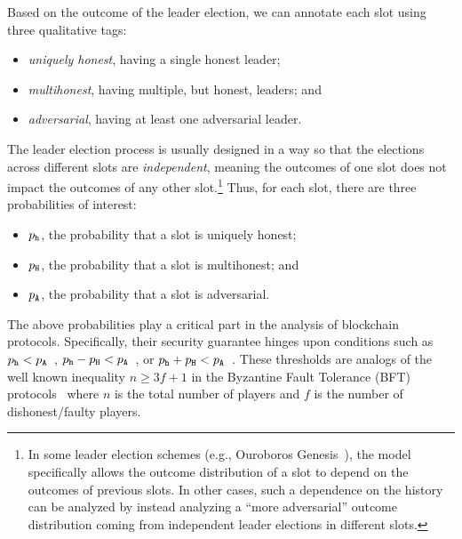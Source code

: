 \label{sec:leader-election-probs}
Based on the outcome of the leader election, 
we can annotate each slot using three qualitative tags: 
\begin{itemize}
\item \emph{uniquely honest}, having a single honest leader;
\item \emph{multihonest}, having multiple, but honest,
  leaders; and
\item \emph{adversarial}, having at least one adversarial leader.
\end{itemize}
The leader election process is usually designed in a way so that 
the elections across different slots are \emph{independent}, 
meaning the outcomes of one slot does not impact the outcomes of any other slot.\footnote{
  In some leader election schemes (e.g., Ouroboros Genesis~\cite{Genesis}), 
  the model specifically allows 
  the outcome distribution of a slot to depend on the outcomes of previous slots. 
  In other cases, 
  such a dependence on the history can be analyzed 
  by instead analyzing a ``more adversarial'' outcome distribution 
  coming from independent leader elections in different slots. 
}
Thus, for each slot, there are three probabilities of interest:
\begin{itemize}
\item $p_{\mathtt{h}}$, the probability that a slot is uniquely honest;
\item $p_{\mathtt{H}}$, the probability that a slot is multihonest; and
\item $p_{\mathtt{A}}$, the probability that a slot is adversarial.
\end{itemize}

The above probabilities play a critical part 
in the analysis of blockchain protocols. 
Specifically, 
their security guarantee hinges upon conditions such as 
$p_{\mathtt{h}} < p_{\mathtt{A}}$~\cite{SnowWhite}, 
$p_{\mathtt{h}} - p_{\mathtt{H}} < p_{\mathtt{A}}$~\cite{Ouroboros,Praos,Genesis}, 
or $p_{\mathtt{h}} + p_{\mathtt{H}} < p_{\mathtt{A}}$~\cite{Nakamoto2008,GKL,PSS}.
These thresholds are analogs of the well known inequality 
$n \geq 3f + 1$ in the Byzantine Fault Tolerance (BFT) protocols~\cite{BFT} 
where $n$ is the total number of players and $f$ is the number of dishonest/faulty players.


